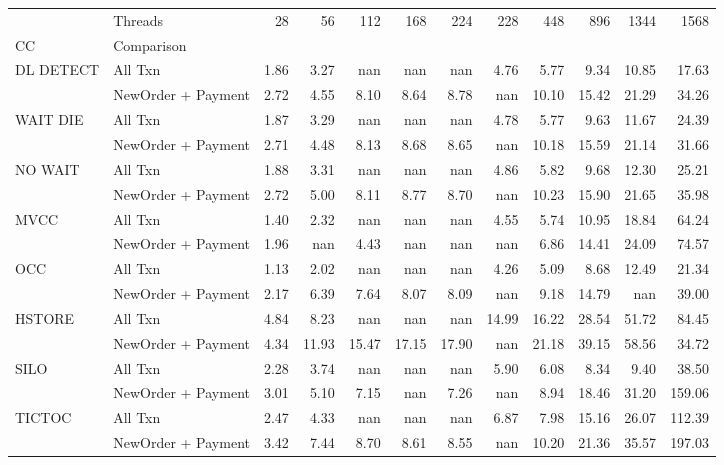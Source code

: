 \begin{tabular}{llrrrrrrrrrr}
\toprule
       & Threads &  28   &  56   &  112  &  168  &  224  &  228  &  448  &  896  &  1344 &   1568 \\
CC & Comparison &       &       &       &       &       &       &       &       &       &        \\
\midrule
DL DETECT & All Txn &  1.86 &  3.27 &   nan &   nan &   nan &  4.76 &  5.77 &  9.34 & 10.85 &  17.63 \\
       & NewOrder + Payment &  2.72 &  4.55 &  8.10 &  8.64 &  8.78 &   nan & 10.10 & 15.42 & 21.29 &  34.26 \\
WAIT DIE & All Txn &  1.87 &  3.29 &   nan &   nan &   nan &  4.78 &  5.77 &  9.63 & 11.67 &  24.39 \\
       & NewOrder + Payment &  2.71 &  4.48 &  8.13 &  8.68 &  8.65 &   nan & 10.18 & 15.59 & 21.14 &  31.66 \\
NO WAIT & All Txn &  1.88 &  3.31 &   nan &   nan &   nan &  4.86 &  5.82 &  9.68 & 12.30 &  25.21 \\
       & NewOrder + Payment &  2.72 &  5.00 &  8.11 &  8.77 &  8.70 &   nan & 10.23 & 15.90 & 21.65 &  35.98 \\
MVCC & All Txn &  1.40 &  2.32 &   nan &   nan &   nan &  4.55 &  5.74 & 10.95 & 18.84 &  64.24 \\
       & NewOrder + Payment &  1.96 &   nan &  4.43 &   nan &   nan &   nan &  6.86 & 14.41 & 24.09 &  74.57 \\
OCC & All Txn &  1.13 &  2.02 &   nan &   nan &   nan &  4.26 &  5.09 &  8.68 & 12.49 &  21.34 \\
       & NewOrder + Payment &  2.17 &  6.39 &  7.64 &  8.07 &  8.09 &   nan &  9.18 & 14.79 &   nan &  39.00 \\
HSTORE & All Txn &  4.84 &  8.23 &   nan &   nan &   nan & 14.99 & 16.22 & 28.54 & 51.72 &  84.45 \\
       & NewOrder + Payment &  4.34 & 11.93 & 15.47 & 17.15 & 17.90 &   nan & 21.18 & 39.15 & 58.56 &  34.72 \\
SILO & All Txn &  2.28 &  3.74 &   nan &   nan &   nan &  5.90 &  6.08 &  8.34 &  9.40 &  38.50 \\
       & NewOrder + Payment &  3.01 &  5.10 &  7.15 &   nan &  7.26 &   nan &  8.94 & 18.46 & 31.20 & 159.06 \\
TICTOC & All Txn &  2.47 &  4.33 &   nan &   nan &   nan &  6.87 &  7.98 & 15.16 & 26.07 & 112.39 \\
       & NewOrder + Payment &  3.42 &  7.44 &  8.70 &  8.61 &  8.55 &   nan & 10.20 & 21.36 & 35.57 & 197.03 \\
\bottomrule
\end{tabular}
